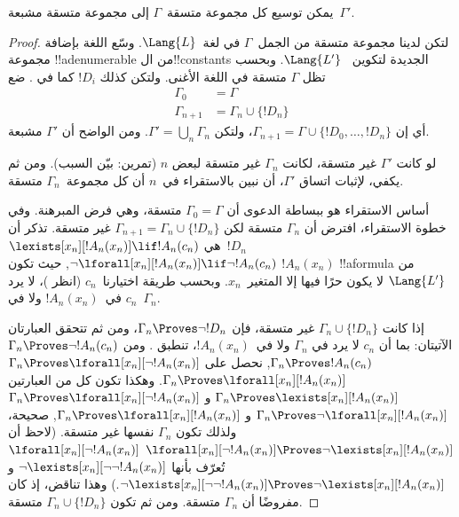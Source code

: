 \documentclass[../../../include/open-logic-section]{subfiles}
\begin{document}
\begin{lem}
يمكن توسيع كل مجموعة متسقة~$\Gamma$ إلى مجموعة متسقة مشبعة~$\Gamma'$.
\end{lem}

\begin{proof}
لتكن لدينا مجموعة متسقة من الجمل~$\Gamma$ في لغة~$\Lang{L}$. وسّع
اللغة بإضافة مجموعة !!a{denumerable} من ال!!{constant}s الجديدة لتكوين
~$\Lang{L'}$. وبحسب  تظل $\Gamma$ متسقة في اللغة
الأغنى. ولتكن كذلك $!D_i$ كما في . ضع
\begin{align*}
\Gamma_0 & = \Gamma \\
\Gamma_{n+1} & = \Gamma_n \cup \{!D_n \}
\end{align*}
أي إن $\Gamma_{n+1} = \Gamma \cup \{ !D_0, \dots, !D_n \}$، ولتكن
$\Gamma' = \bigcup_{n} \Gamma_n$. ومن الواضح أن $\Gamma'$ مشبعة.

لو كانت $\Gamma'$ غير متسقة، لكانت $\Gamma_n$ غير متسقة لبعض $n$
(تمرين: بيّن السبب). ومن ثم يكفي، لإثبات اتساق $\Gamma'$، أن نبين
بالاستقراء في~$n$ أن كل مجموعة~$\Gamma_n$ متسقة.

أساس الاستقراء هو ببساطة الدعوى أن $\Gamma_0 = \Gamma$ متسقة، وهي فرض
المبرهنة. وفي خطوة الاستقراء، افترض أن $\Gamma_{n}$ متسقة لكن
$\Gamma_{n+1} = \Gamma_n \cup \{!D_n\}$ غير متسقة. تذكر أن $!D_n$~هي
{$\lexists[x_{n}][!A_{n}(x_n)] \lif !A_{n}(c_{n})$}
{$\lnot\lforall[x_{n}][!A_{n}(x_n)] \lif \lnot !A_{n}(c_{n})$},
حيث تكون $!A_n(x_n)$ !!a{formula} من $\Lang{L'}$ لا يكون حرًا فيها إلا
المتغير~$x_n$. وبحسب طريقة اختيارنا~$c_n$ (انظر
)، لا يرد $c_n$ في~$!A_n(x_n)$ ولا في~$\Gamma_n$.

إذا كانت $\Gamma_n \cup \{!D_n\}$ غير متسقة، فإن $\Gamma_n
\Proves \lnot !D_n$، ومن ثم تتحقق العبارتان الآتيتان:
بما أن $c_n$ لا يرد في $\Gamma_n$ ولا في~$!A_n(x_n)$، تنطبق
.
ومن 
{$\Gamma_n \Proves \lnot !A_n(c_n)$}
{$\Gamma_n \Proves !A_n(c_n)$},
نحصل على
{$\Gamma_n \Proves \lforall[x_n][\lnot !A_n(x_n)]$}
{$\Gamma_n \Proves \lforall[x_n][!A_n(x_n)]$}.
وهكذا تكون كل من العبارتين
{$\Gamma_n \Proves \lexists[x_n][!A_n(x_n)]$ و
$\Gamma_n \Proves \lforall[x_n][\lnot !A_n(x_n)]$}
{$\Gamma_n \Proves \lnot\lforall[x_n][!A_n(x_n)]$ و
$\Gamma_n \Proves \lforall[x_n][!A_n(x_n)]$},
صحيحة، ولذلك تكون $\Gamma_n$ نفسها غير متسقة.
{(لاحظ أن
{$\lforall[x_n][\lnot !A_n(x_n)] \Proves
  \lnot\lexists[x_n][!A_n(x_n)]$}
{$\lforall[x_n][\lnot !A_n(x_n)]$ تُعرّف بأنها
  $\lnot\lexists[x_n][\lnot\lnot !A_n(x_n)]$ و
  $\lnot\lexists[x_n][\lnot\lnot !A_n(x_n)] \Proves
  \lnot\lexists[x_n][!A_n(x_n)]$}.)}{}
وهذا تناقض، إذ كان مفروضًا أن $\Gamma_n$ متسقة. ومن ثم تكون
$\Gamma_n \cup \{ !D_n\}$ متسقة.
\end{proof}
\end{document}
